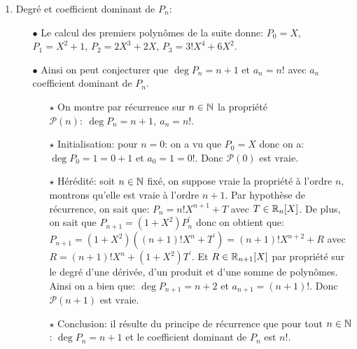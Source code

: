 \documentclass[a4paper, 11pt,reqno]{article}
\begin{document}
\begin{correction}
\begin{enumerate}
\begin{itemize}
\begin{itemize}
				                  Si on pose $P_{n+1}=(1+X^2)P_n^{\prime}$. C'est bien un polyn\^ome car $1+X^2$ est un polyn\^ome, $P_n^{\prime}$ est un polyn\^ome car c'est la d\'eriv\'ee d'un polyn\^ome et la somme de deux polyn\^omes est un polyn\^ome. Ainsi, $P_{n+1}$ est un polyn\^ome et on a bien
				                  $$\forall x\in\mathcal{D}_f,\qquad f^{(n+1)}(x)=P_{n+1}(\tan{x}).$$
				            \item[$\star$] Cette fonction $f^{(n+1)}$ est bien continue sur $\mathcal{D}_f$ et donc $f$ est bien de classe $C^{n+1}$ sur $\mathcal{D}_f$.
			            \end{itemize}
			            Ainsi, $\mathcal{P}(n+1)$ est vraie.
			      \item[$\bullet$]   Conclusion: il r\'esulte du principe de r\'ecurrence que la d\'eriv\'ee $n$-i\`eme de la fonction tangente est bien de la forme $P_n\circ \tan$ avec $P_n$ polyn\^ome.
		      \end{itemize}
		\item Degr\'e et coefficient dominant de $P_n$:
		      \begin{itemize}
			      \item[$\bullet$] Le calcul des premiers polyn\^{o}mes de la suite donne: $P_0=X$, $P_1=X^2+1$, $P_2=2X^3+2X$, $P_3=3!X^4+6X^2$.
			      \item[$\bullet$] Ainsi on peut conjecturer que $\deg{P_n}=n+1$ et $a_n=n!$ avec $a_n$ coefficient dominant de $P_n$.
			            \begin{itemize}
				            \item[$\star$] On montre par r\'ecurrence sur $n\in\mathbb{N}$ la propri\'et\'e $\mathcal{P}(n):\ \deg{P_n}=n+1,\ a_n=n!$.
				            \item[$\star$] Initialisation: pour $n=0$: on a vu que $P_0=X$ donc on a: $\deg{P_0}=1=0+1$ et $a_0=1=0!$. Donc $\mathcal{P}(0)$ est vraie.
				            \item[$\star$] H\'er\'edit\'e: soit $n\in\mathbb{N}$ fix\'e, on suppose vraie la propri\'et\'e \`{a} l'ordre $n$, montrons qu'elle est vraie \`{a} l'ordre $n+1$. Par hypoth\`{e}se de r\'ecurrence, on sait que: $P_n=n! X^{n+1}+T$ avec $T\in\mathbb{R}_n\lbrack X\rbrack$. De plus, on sait que $P_{n+1}=(1+X^2)P_n^{\prime}$ donc on obtient que: $P_{n+1}=(1+X^2)((n+1)! X^n+T^{\prime})=(n+1)!X^{n+2}+R$ avec $R=(n+1)! X^n+(1+X^2)T^{\prime}$. Et $R\in \mathbb{R}_{n+1}\lbrack X\rbrack$ par propri\'et\'e sur le degr\'e d'une d\'eriv\'ee, d'un produit et d'une somme de polyn\^{o}mes. Ainsi on a bien que: $\deg{P_{n+1}}=n+2$ et $a_{n+1}=(n+1)!$. Donc $\mathcal{P}(n+1)$ est vraie.
				            \item[$\star$] Conclusion: il r\'esulte du principe de r\'ecurrence que pour tout $n\in\mathbb{N}$: $\deg{P_n}=n+1$ et le coefficient dominant de $P_n$ est $n!$.
			            \end{itemize}
		      \end{itemize}
	\end{enumerate}
\end{correction}
\end{document}
